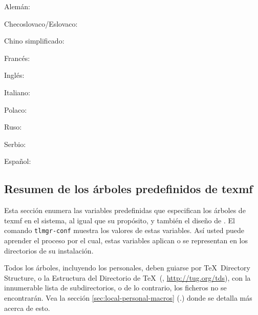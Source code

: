 \documentclass{article}
\begin{document}
\begin{itemize*}
\item{Alemán:} 
\item{Checoslovaco/Eslovaco:} 
\item{Chino simplificado:} 
\item{Francés:} 
\item{Inglés:} 
\item{Italiano:} 
\item{Polaco:} 
\item{Ruso:} 
\item{Serbio:} 
\item{Español:} 
\end{itemize*}

\subsection{Resumen de los árboles predefinidos de texmf}
\label{sec:texmftrees}

Esta sección enumera las variables predefinidas que especifican los
árboles de texmf en el sistema, al igual que su propósito, y también
el diseño de \TL{}. El comando \texttt{tlmgr-conf} muestra los valores
de estas variables. Así usted puede aprender el proceso por el cual,
estas variables aplican o se representan en los directorios de su
instalación.

Todos los árboles, incluyendo los personales, deben guiarse por \TeX\
Directory Structure, o la Estructura del Directorio de \TeX\ (\TDS,
\url{http://tug.org/tds}), con la innumerable lista de
subdirectorios, o de lo contrario, los ficheros no se encontrarán. Vea
la sección \ref{sec:local-personal-macros}
(\p.\pageref{sec:local-personal-macros}) donde se detalla más acerca
de esto.
\end{document}
